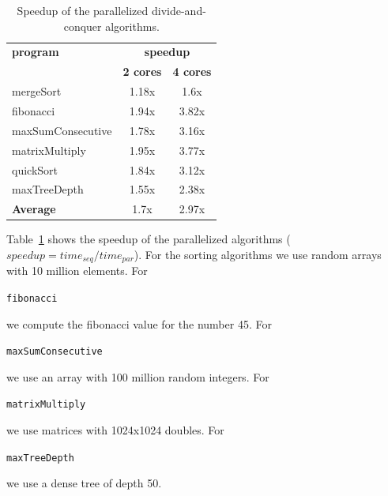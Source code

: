 \documentclass[10pt,twocolumn]{article}
\newcommand{\tool}{\begin{scriptsize}\textsc{Concurrencer}\end{scriptsize}\xspace}
\newcommand{\code}[1]{\begin{smaller}\texttt{#1}\end{smaller}}
\begin{document}
\begin{table}[t]
\renewcommand{\arraystretch}{1.3}
\centering
\begin{footnotesize}
\begin{tabular}{l|cc}

\textbf{program}                                      & \multicolumn{2}{|c}{\textbf{speedup}} \\ 
                                                           &\textbf{2 cores}  &  \textbf{4 cores}  \\ \hline 
mergeSort                                                   & 1.18x               & 1.6x       \\
fibonacci                                                   & 1.94x               & 3.82x       \\     
maxSumConsecutive                                           & 1.78x               & 3.16x       \\
matrixMultiply                                              & 1.95x               & 3.77x       \\
quickSort                                                   & 1.84x               & 3.12x      \\   
maxTreeDepth                                                & 1.55x               & 2.38x      \\ \hline
\textbf{Average}                                            & 1.7x                & 2.97x      \\
\end{tabular}
\caption{Speedup of the parallelized divide-and-conquer algorithms.}
\label{tab:DivideAndConquerAlgorithms}
\end{footnotesize}
\end{table}


Table~\ref{tab:DivideAndConquerAlgorithms} shows the speedup of the 
parallelized algorithms ($speedup = time_{seq} / time_{par}$). For the sorting
algorithms we use random arrays with 10 million elements. For \code{fibonacci}
we compute the fibonacci value for the number 45. For \code{maxSumConsecutive}
we use an array with 100 million random integers. For \code{matrixMultiply} we
use matrices with 1024x1024 doubles. For \code{maxTreeDepth} we use a dense
tree of depth 50.



\end{document}
